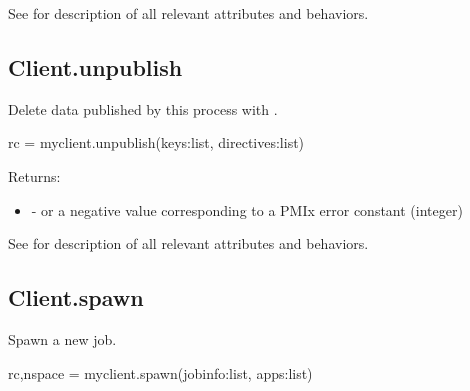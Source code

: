 See  for description of all relevant attributes and behaviors.


\subsection{Client.unpublish}

\summary

Delete data published by this process with .

\format

\pyspecificstart
\begin{codepar}
rc = myclient.unpublish(keys:list, directives:list)
\end{codepar}
\pyspecificend

\begin{arglist}
\end{arglist}

Returns:

\begin{itemize}
    \item {} -  or a negative value corresponding to a PMIx error constant (integer)
\end{itemize}

See  for description of all relevant attributes and behaviors.


\subsection{Client.spawn}

\summary

Spawn a new job.

\format

\pyspecificstart
\begin{codepar}
rc,nspace = myclient.spawn(jobinfo:list, apps:list)
\end{codepar}
\pyspecificend

\begin{arglist}
\end{arglist}

